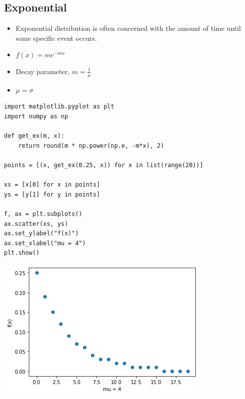 \documentclass[11pt]{article}
\begin{document}
\subsection{Exponential}
\label{sec:org8377971}

\begin{itemize}
\item Exponential distribution is often concerned with the amount of time until some specific event occurs.
\item \(f(x) = me^{-mx}\)
\item Decay parameter, \(m = \frac{1}{\mu}\)
\item \(\mu = \sigma\)
\end{itemize}

\begin{verbatim}
import matplotlib.pyplot as plt
import numpy as np

def get_ex(m, x):
    return round(m * np.power(np.e, -m*x), 2)

points = [(x, get_ex(0.25, x)) for x in list(range(20))]

xs = [x[0] for x in points]
ys = [y[1] for y in points]

f, ax = plt.subplots()
ax.scatter(xs, ys)
ax.set_ylabel("f(x)")
ax.set_xlabel("mu = 4")
plt.show()
\end{verbatim}

\begin{center}
\includegraphics[width=.9\linewidth]{./obipy-resources/Mow79W.png}
\end{center}
\end{document}
